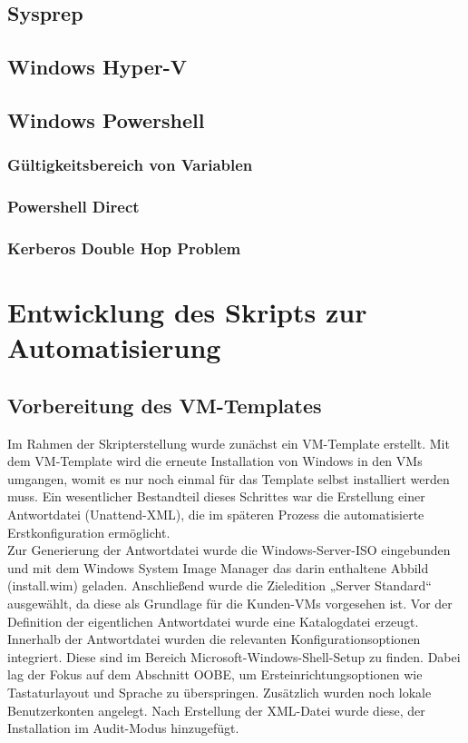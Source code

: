 \documentclass[a4paper,12pt]{article}
\begin{document}
\subsection{Sysprep}
\subsection{Windows Hyper-V}
\subsection{Windows Powershell}
\subsubsection{Gültigkeitsbereich von Variablen}
\subsubsection{Powershell Direct}
\subsubsection{Kerberos Double Hop Problem}



\section{Entwicklung des Skripts zur Automatisierung}

\subsection{Vorbereitung des VM-Templates}

Im Rahmen der Skripterstellung wurde zunächst ein VM-Template erstellt. Mit dem VM-Template wird die erneute Installation von Windows in den VMs umgangen, womit es nur noch einmal für das Template selbst installiert werden muss.
Ein wesentlicher Bestandteil dieses Schrittes war die Erstellung einer Antwortdatei (Unattend-XML), die im späteren Prozess die automatisierte Erstkonfiguration ermöglicht.\\

Zur Generierung der Antwortdatei wurde die Windows-Server-ISO eingebunden und mit dem Windows System Image Manager das darin enthaltene Abbild (install.wim) geladen.
Anschließend wurde die Zieledition „Server Standard“ ausgewählt, da diese als Grundlage für die Kunden-VMs vorgesehen ist. Vor der Definition der eigentlichen Antwortdatei wurde eine Katalogdatei erzeugt.
Innerhalb der Antwortdatei wurden die relevanten Konfigurationsoptionen integriert. Diese sind im Bereich Microsoft-Windows-Shell-Setup zu finden.
Dabei lag der Fokus auf dem Abschnitt OOBE, um Ersteinrichtungsoptionen wie Tastaturlayout und Sprache zu überspringen. Zusätzlich wurden noch lokale Benutzerkonten angelegt. 
Nach Erstellung der XML-Datei wurde diese, der Installation im Audit-Modus hinzugefügt.\\
\end{document}
